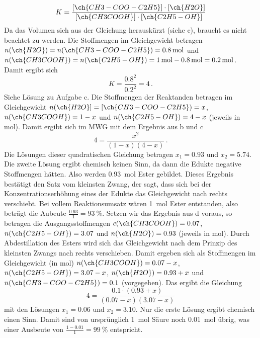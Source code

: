 \documentclass[DIV11]{scrartcl}
\begin{document}
\begin{solution}
  \begin{tasks}
    \task \[ K = \frac{[\ch{CH3-COO-C2H5}]\cdot[\ch{H2O}]}{[\ch{CH3COOH}]\cdot[\ch{C2H5-OH}]} \]
    \task Da das Volumen sich aus der Gleichung herauskürzt (siehe c),
      braucht es nicht beachtet zu werden.  Die Stoffmengen im
      Gleichgewicht betragen $n(\ch{H2O})=n(\ch{CH3-COO-C2H5})=\SI{0.8}{\mole}$
      und $n(\ch{CH3COOH})=n(\ch{C2H5-OH})=\SI{1}{\mole}-\SI{.8}{\mole} =
      \SI{.2}{\mole}$. Damit ergibt sich
      \[ K = \frac{0.8^2}{0.2^2} = 4 \,. \]
    \task Siehe Lösung zu Aufgabe c.
    \task Die Stoffmengen der Reaktanden betragen im Gleichgewicht
      $n(\ch{H2O}]=[\ch{CH3-COO-C2H5})=x$, $n(\ch{CH3COOH})=1-x$ und
      $n(\ch{C2H5-OH})=4-x$ (jeweils in \si{\mole}).  Damit ergibt sich im
      MWG mit dem Ergebnis aus b und c \[ 4 = \frac{x^2}{(1-x)(4-x)}\,. \]
      Die Lösungen dieser quadratischen Gleichung betragen $x_1=0.93$ und
      $x_2=5.74$.  Die zweite Lösung ergibt chemisch keinen Sinn, da dann
      die Edukte negative Stoffmengen hätten.  Also werden \SI{0.93}{\mole}
      Ester gebildet.  Dieses Ergebnis bestätigt den Satz vom kleinsten
      Zwang, der sagt, dass sich bei der Konzentrationserhöhung eines der
      Edukte das Gleichgewicht nach rechts verschiebt.
    \task Bei vollem Reaktionsumsatz wären \SI{1}{\mole} Ester entstanden, also
      beträgt die Aubeute $\frac{0.93}{1}=\SI{93}{\percent}$.
    \task Setzen wir das Ergebnis aus d voraus, so betragen die
      Ausgangsstoffmengen $c(\ch{CH3COOH})=0.07$, $n(\ch{C2H5-OH})=3.07$
      und $n(\ch{H2O})=0.93$ (jeweils in \si{\mole}).  Durch Abdestillation
      des Esters wird sich das Gleichgewicht nach dem Prinzip des kleinsten
      Zwangs nach rechts verschieben.  Damit ergeben sich als Stoffmengen im
      Gleichgewicht (in \si{\mole}) $n(\ch{CH3COOH}) = 0.07-x$,
      $n(\ch{C2H5-OH}) = 3.07-x$, $n(\ch{H2O}) = 0.93+x$ und
      $n(\ch{CH3-COO-C2H5}) = 0.1$ (vorgegeben).  Das ergibt die Gleichung
      \[ 4 = \frac{0.1\cdot(0.93+x)}{(0.07-x)(3.07-x)} \]
      mit den Lösungen $x_1=0.06$ und $x_2=3.10$.  Nur die erste Lösung ergibt
      chemisch einen Sinn.  Damit sind von ursprünglich \SI{1}{\mole} Säure noch
      \SI{0.01}{\mole} übrig, was einer Ausbeute von $\frac{1-0.01}{1} =
      \SI{99}{\percent}$ entspricht.
  \end{tasks}
\end{solution}
\end{document}
